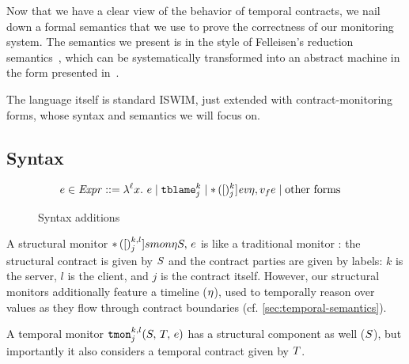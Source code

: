 Now that we have a clear view of the behavior of temporal contracts, we nail down a formal semantics that we use to prove the correctness of our monitoring system.
%
The semantics we present is in the style of Felleisen's reduction semantics~\citep{ianjohnson:Felleisen:2009:SEP:1795772}, which can be systematically transformed into an abstract machine in the form presented in~\citet{dvanhorn:VanHorn2010Abstracting}.

The language itself is standard ISWIM, just extended with contract-monitoring forms, whose syntax and semantics we will focus on.
%
\subsection{Syntax}

\begin{figure}
\begin{align*}
e \in \mathit{Expr} &::=
      \lambda^{\ell} x.\ e
 \mid {\tt tblame}^{k}_{j} 
 \mid {\tt *}{\,}({[})^{k}_{j}]{\mathit{ev}}{\eta,v_f}{e}
 \mid \text{other forms}
\end{align*}
\caption{Syntax additions}
\label{fig:syntax}
\end{figure}

%
A structural monitor ${\tt *}{\,}({[})^{k,l}_{j}]{smon}{\eta}{S,\, e}$ is like a traditional monitor \cite{ianjohnson:dthf:complete}: the structural contract is given by $S$ and the contract parties are given by labels: $k$ is the server, $l$ is the client, and $j$ is the contract itself.
%
However, our structural monitors additionally feature a timeline ($\eta$), used to temporally reason over values as they flow through contract boundaries (cf. \autoref{sec:temporal-semantics}).
%

%
A temporal monitor ${\tt tmon}{^{k,l}_{j}}({S,\,T,\,e})$ has a structural component as well ($S$), but importantly it also considers a temporal contract given by $T$.
%

